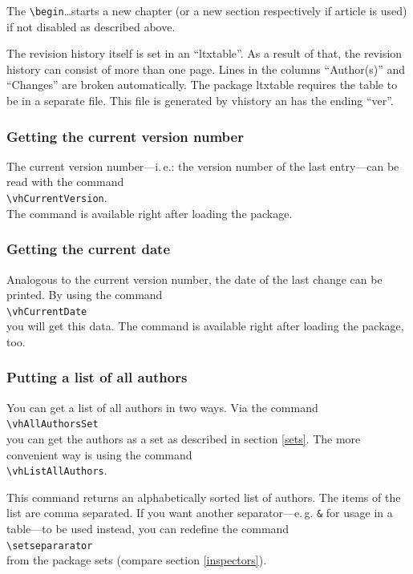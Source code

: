 The \verb|\begin|\ldots starts a new chapter (or a new section respectively if article is used) if not disabled as described above.

The revision history itself is set in an ``ltxtable''. As a result of that, the revision history can consist of more than one page. Lines in the columns ``Author(s)'' and ``Changes'' are broken automatically. The package ltxtable requires the table to be in a separate file. This file is generated by vhistory an has the ending ``ver''.

\subsubsection{Getting the current version number}
The current version number---i.\,e.: the version number of the last entry---can be read with the command\\
\mbox{}\hspace{2em}\verb|\vhCurrentVersion|.\\
The command is available right after loading the package.

\subsubsection{Getting the current date}
Analogous to the current version number, the date of the last change can be printed. By using the command\\
\mbox{}\hspace{2em}\verb|\vhCurrentDate|\\
you will get this data. The command is available right after loading the package, too.

\subsubsection{Putting a list of all authors}
You can get a list of all authors in two ways. Via the command\\
\mbox{}\hspace{2em}\verb|\vhAllAuthorsSet|\\
you can get the authors as a set as described in section \ref{sets}. The more convenient way is using the command\\
\mbox{}\hspace{2em}\verb|\vhListAllAuthors|.

This command returns an alphabetically sorted list of authors. The items of the list are comma separated. If you want another separator---e.\,g. \texttt{\&} for usage in a table---to be used instead, you can redefine the command\\
\mbox{}\hspace{2em}\verb|\setsepararator|\\
from the package sets (compare section \ref{inspectors}).

